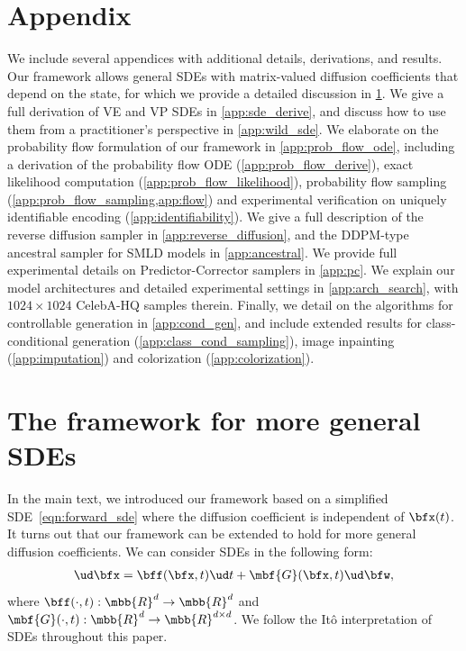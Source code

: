 \newpage
\section*{Appendix}
We include several appendices with additional details, derivations, and results.
Our framework allows general SDEs with matrix-valued diffusion coefficients that depend on the state, for which we provide a detailed discussion in \cref{app:general_sde}. We give a full derivation of VE and VP SDEs in \cref{app:sde_derive}, and discuss how to use them from a practitioner's perspective in \cref{app:wild_sde}. We elaborate on the probability flow formulation of our framework in \cref{app:prob_flow_ode}, including a derivation of the probability flow ODE (\cref{app:prob_flow_derive}), exact likelihood computation (\cref{app:prob_flow_likelihood}), probability flow sampling (\cref{app:prob_flow_sampling,app:flow}) and experimental verification on uniquely identifiable encoding (\cref{app:identifiability}). We give a full description of the reverse diffusion sampler in \cref{app:reverse_diffusion}, and the DDPM-type ancestral sampler for SMLD models in \cref{app:ancestral}. We provide full experimental details on Predictor-Corrector samplers in \cref{app:pc}. We explain our model architectures and detailed experimental settings in \cref{app:arch_search}, with $1024\times 1024$ CelebA-HQ samples therein. Finally, we detail on the algorithms for controllable generation in \cref{app:cond_gen}, and include extended results for class-conditional generation (\cref{app:class_cond_sampling}), image inpainting (\cref{app:imputation}) and colorization (\cref{app:colorization}).

\section{The framework for more general SDEs}\label{app:general_sde}
In the main text, we introduced our framework based on a simplified SDE~\cref{eqn:forward_sde} where the diffusion coefficient is independent of $\bfx(t)$. It turns out that our framework can be extended to hold for more general diffusion coefficients. We can consider SDEs in the following form:
\begin{align}
    \ud \bfx = \bff(\bfx, t) \ud t + \mbf{G}(\bfx, t) \ud \bfw, \label{eqn:forward_sde_2}
\end{align}
where $\bff(\cdot, t): \mbb{R}^d \to \mbb{R}^d$ and $\mbf{G}(\cdot, t): \mbb{R}^d \to \mbb{R}^{d\times d}$. We follow the It\^{o} interpretation of SDEs throughout this paper.

